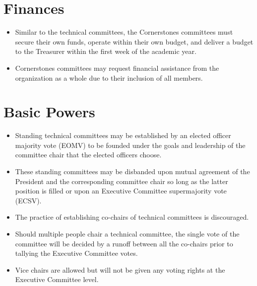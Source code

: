 \documentclass[12pt]{constitution}
\begin{document}
\section{Finances}
\label{sec:corner_finance}
\begin{itemize}
    \item Similar to the technical committees, the Cornerstones committees must secure their own funds, operate within their own budget, and deliver a budget to the Treasurer within the first week of the academic year.
    \item Cornerstones committees may request financial assistance from the organization as a whole due to their inclusion of all members.
\end{itemize}


\label{art:technical}

\section{Basic Powers}
\label{sec:tech_pow}
\begin{itemize}
    \item Standing technical committees may be established by an elected officer majority vote (EOMV) to be founded under the goals and leadership of the committee chair that the elected officers choose.
    \item These standing committees may be disbanded upon mutual agreement of the President and the corresponding committee chair so long as the latter position is filled or upon an Executive Committee supermajority vote (ECSV).
    \item The practice of establishing co-chairs of technical committees is discouraged.
    \item Should multiple people chair a technical committee, the single vote of the committee will be decided by a runoff between all the co-chairs prior to tallying the Executive Committee votes.
    \item Vice chairs are allowed but will not be given any voting rights at the Executive Committee level.
\end{itemize}
\end{document}
